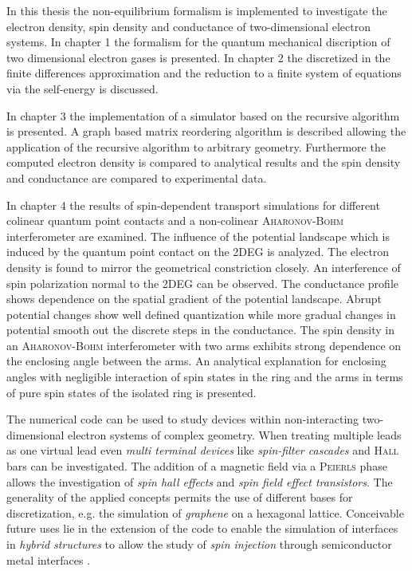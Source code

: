 In this thesis the non-equilibrium \gfnc{} formalism is implemented to investigate the electron density, spin density and conductance of two-dimensional electron systems. In chapter 1 the \gfnc{} formalism for the quantum mechanical discription of two dimensional electron gases is presented. In chapter 2 the discretized \hamil{} in the finite differences approximation and the reduction to a finite system of equations via the self-energy is discussed.\par
In chapter 3 the implementation of a simulator based on the recursive \gfnc{} algorithm is presented. A graph based matrix reordering algorithm is described allowing the application of the recursive \gfnc{} algorithm to arbitrary geometry.
Furthermore the computed electron density is compared to analytical results and the spin density and conductance are compared to experimental data.\par
In chapter 4 the results of spin-dependent transport simulations for different colinear quantum point contacts and a non-colinear \textsc{Aharonov-Bohm} interferometer are examined. The influence of the potential landscape which is induced by the quantum point contact on the 2DEG is analyzed.
The electron density is found to mirror the geometrical constriction closely. An interference of spin polarization normal to the 2DEG can be observed. The conductance profile shows dependence on the spatial gradient of the potential landscape. Abrupt potential changes show well defined quantization while more gradual changes in potential smooth out the discrete steps in the conductance.
The spin density in an \textsc{Aharonov-Bohm} interferometer with two arms exhibits strong dependence on the enclosing angle between the arms. An analytical explanation for enclosing angles with negligible interaction of spin states in the ring and the arms in terms of pure spin states of the isolated ring is presented.\par
The numerical code can be used to study devices within non-interacting two-dimensional electron systems of complex geometry. When treating multiple leads as one virtual lead even \emph{multi terminal devices} like \emph{spin-filter cascades} \cite{jacob:093714} and \textsc{Hall} bars \cite{Wunderlich24122010} can be investigated. The addition of a magnetic field via a \textsc{Peierls} phase allows the investigation of \emph{spin hall effects} and \emph{spin field effect transistors}. The generality of the applied concepts permits the use of different bases for discretization, e.g. the simulation of \emph{graphene} on a hexagonal lattice. Conceivable future uses lie in the extension of the code to enable the simulation of interfaces in \emph{hybrid structures} to allow the study of \emph{spin injection} through semiconductor metal interfaces \cite{holz:431}.
